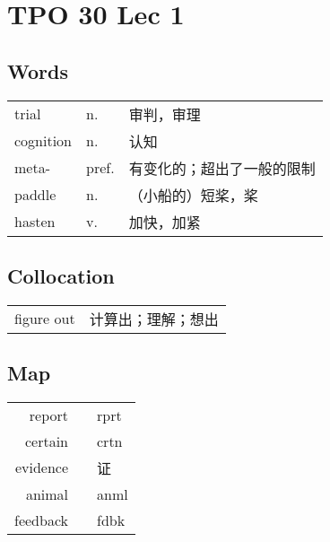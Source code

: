 \section{TPO 30 Lec 1}

\subsection{Words}

\begin{tabular}{lll}
    trial     & n.    & 审判，审理         \\
    cognition & n.    & 认知            \\
    meta-     & pref. & 有变化的；超出了一般的限制 \\
    paddle    & n.    & （小船的）短桨，桨     \\
    hasten    & v.    & 加快，加紧         \\
\end{tabular}

\subsection{Collocation}

\begin{tabular}{ll}
    figure out & 计算出；理解；想出 \\
\end{tabular}

\subsection{Map}

\begin{tabular}{rc@{\quad$\to$\quad}l}
    report   &  & rprt \\
    certain  &  & crtn \\
    evidence &  & 证    \\
    animal   &  & anml \\
    feedback &  & fdbk \\
\end{tabular}
